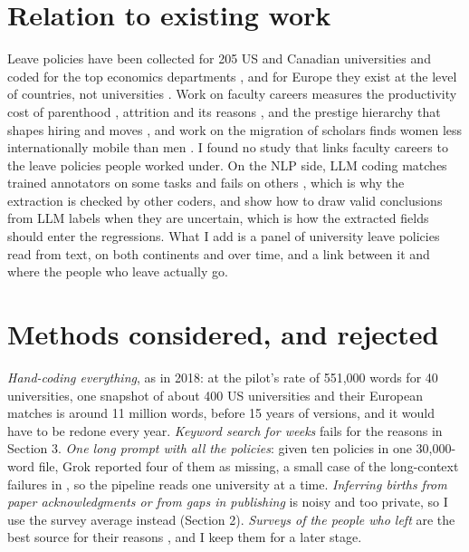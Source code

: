 \documentclass[10pt,twocolumn]{article}
\begin{document}
\section{Relation to existing work}
Leave policies have been collected for 205 US and Canadian universities \citep{morgan2018} and coded for the top economics departments \citep{antecol2018}, and for Europe they exist at the level of countries, not universities \citep{spitzer2026}. Work on faculty careers measures the productivity cost of parenthood \citep{morgan2021}, attrition and its reasons \citep{spoon2023}, and the prestige hierarchy that shapes hiring and moves \citep{wapman2022}, and work on the migration of scholars finds women less internationally mobile than men \citep{zhao2023}. I found no study that links faculty careers to the leave policies people worked under. On the NLP side, LLM coding matches trained annotators on some tasks and fails on others \citep{bamman2024,than2025}, which is why the extraction is checked by other coders, and \citet{gligoric2025} show how to draw valid conclusions from LLM labels when they are uncertain, which is how the extracted fields should enter the regressions. What I add is a panel of university leave policies read from text, on both continents and over time, and a link between it and where the people who leave actually go.

\section{Methods considered, and rejected}
\emph{Hand-coding everything}, as in 2018: at the pilot's rate of 551,000 words for 40 universities, one snapshot of about 400 US universities and their European matches is around 11 million words, before 15 years of versions, and it would have to be redone every year. \emph{Keyword search for weeks} fails for the reasons in Section 3. \emph{One long prompt with all the policies}: given ten policies in one 30,000-word file, Grok reported four of them as missing, a small case of the long-context failures in \citet{karpinska2024}, so the pipeline reads one university at a time. \emph{Inferring births from paper acknowledgments or from gaps in publishing} is noisy and too private, so I use the survey average instead (Section 2). \emph{Surveys of the people who left} are the best source for their reasons \citep{spoon2023}, and I keep them for a later stage.
\end{document}
